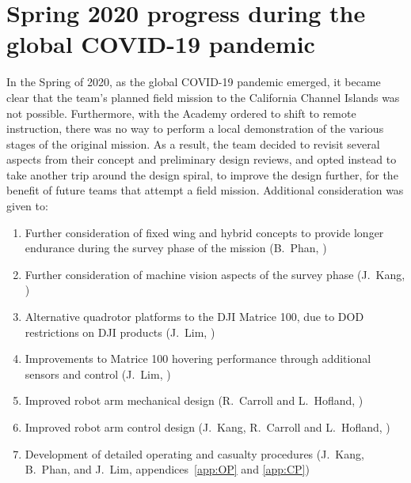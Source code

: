 \section*{Spring 2020 progress during the global COVID-19 pandemic}

In the Spring of 2020, as the global COVID-19 pandemic emerged, it became clear that the team's planned field mission to the California Channel Islands was not possible. Furthermore, with the Academy ordered to shift to remote instruction, there was no way to perform a local demonstration of the various stages of the original mission. As a result, the team decided to revisit several aspects from their concept and preliminary design reviews, and opted instead to take another trip around the design spiral, to improve the design further, for the benefit of future teams that attempt a field mission. Additional consideration was given to:
\begin{enumerate}
\item Further consideration of fixed wing and hybrid concepts to provide longer endurance during the survey phase of the mission (B.~Phan, )
\item Further consideration of machine vision aspects of the survey phase (J.~Kang, )
\item Alternative quadrotor platforms to the DJI Matrice 100, due to DOD restrictions on DJI products (J.~Lim, )
\item Improvements to Matrice 100 hovering performance through additional sensors and control (J.~Lim, )
\item Improved robot arm mechanical design (R.~Carroll and L.~Hofland, )
\item Improved robot arm control design (J.~Kang, R.~Carroll and L.~Hofland, )
\item Development of detailed operating and casualty procedures (J.~Kang, B.~Phan, and J.~Lim, appendices~\ref{app:OP} and \ref{app:CP})
\end{enumerate}

